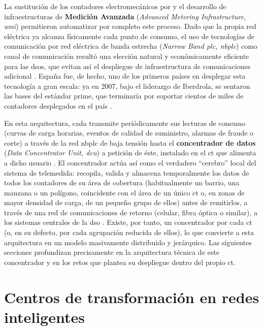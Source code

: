 La sustitución de los contadores electromecánicos por \textbf{} y el desarrollo de infraestructuras de \textbf{Medición Avanzada} (\textit{Advanced Metering Infrastructure, \gls{ami}}) permitieron automatizar por completo este proceso. Dado que la propia red eléctrica ya alcanza físicamente cada punto de consumo, el uso de tecnologías de comunicación por red eléctrica de banda estrecha (\textit{Narrow Band \gls{plc}, \gls{nbplc}}) como canal de comunicación resultó una elección natural y económicamente eficiente para las \glspl{dso}, que evitan así el despliegue de infraestructura de comunicaciones adicional \cite{5764443, SHARMA2017704}. España fue, de hecho, uno de los primeros países en desplegar esta tecnología a gran escala: ya en 2007, bajo el liderazgo de Iberdrola, se sentaron las bases del estándar \gls{prime}, que terminaría por soportar cientos de miles de contadores desplegados en el país \cite{SHARMA2017704}.

En esta arquitectura, cada  transmite periódicamente sus lecturas de consumo (curvas de carga horarias, eventos de calidad de suministro, alarmas de fraude o corte) a través de la red \gls{nbplc} de baja tensión hasta el \textbf{concentrador de datos} (\textit{Data Concentrator Unit, \gls{dcu}}) a petición de éste, instalado en el \gls{ct} que alimenta a dicho usuario \cite{5764443}. El concentrador actúa así como el verdadero ``cerebro'' local del sistema de telemedida: recopila, valida y almacena temporalmente los datos de todos los contadores de su área de cobertura (habitualmente un barrio, una manzana o un polígono, coincidente con el área de un único \gls{ct} o, en zonas de mayor densidad de carga, de un pequeño grupo de ellos) antes de remitirlos, a través de una red de comunicaciones de retorno (celular, fibra óptica o similar), a los sistemas centrales de la \gls{dso} \cite{5764443}. Existe, por tanto, un concentrador por cada \gls{ct} (o, en su defecto, por cada agrupación reducida de ellos), lo que convierte a esta arquitectura en un modelo masivamente distribuido y jerárquico. Las siguientes secciones profundizan precisamente en la arquitectura técnica de este concentrador y en los retos que plantea su despliegue dentro del propio \gls{ct}.

\section{Centros de transformación en redes inteligentes}
\label{sec:centros_transformacion}

